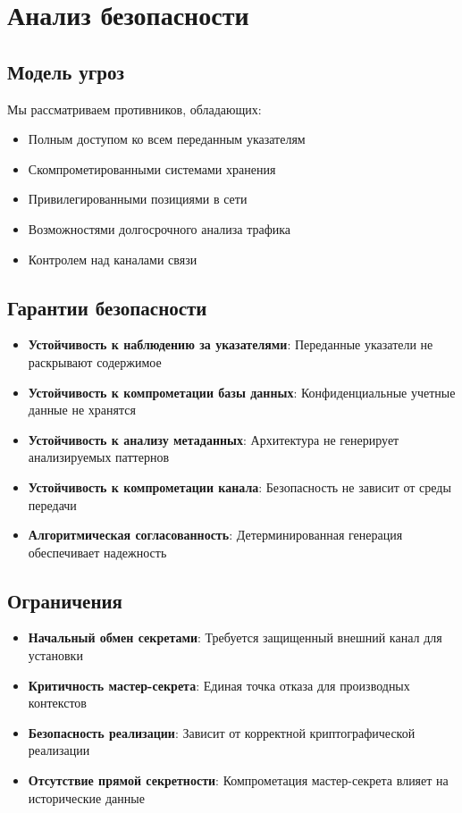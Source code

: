 \documentclass[11pt,a4paper]{article}
\begin{document}
\section{Анализ безопасности}

\subsection{Модель угроз}

Мы рассматриваем противников, обладающих:
\begin{itemize}
\item Полным доступом ко всем переданным указателям
\item Скомпрометированными системами хранения
\item Привилегированными позициями в сети
\item Возможностями долгосрочного анализа трафика
\item Контролем над каналами связи
\end{itemize}

\subsection{Гарантии безопасности}

\begin{itemize}
\item \textbf{Устойчивость к наблюдению за указателями}: Переданные указатели не раскрывают содержимое
\item \textbf{Устойчивость к компрометации базы данных}: Конфиденциальные учетные данные не хранятся
\item \textbf{Устойчивость к анализу метаданных}: Архитектура не генерирует анализируемых паттернов
\item \textbf{Устойчивость к компрометации канала}: Безопасность не зависит от среды передачи
\item \textbf{Алгоритмическая согласованность}: Детерминированная генерация обеспечивает надежность
\end{itemize}

\subsection{Ограничения}

\begin{itemize}
\item \textbf{Начальный обмен секретами}: Требуется защищенный внешний канал для установки
\item \textbf{Критичность мастер-секрета}: Единая точка отказа для производных контекстов
\item \textbf{Безопасность реализации}: Зависит от корректной криптографической реализации
\item \textbf{Отсутствие прямой секретности}: Компрометация мастер-секрета влияет на исторические данные
\end{itemize}
\end{document}
